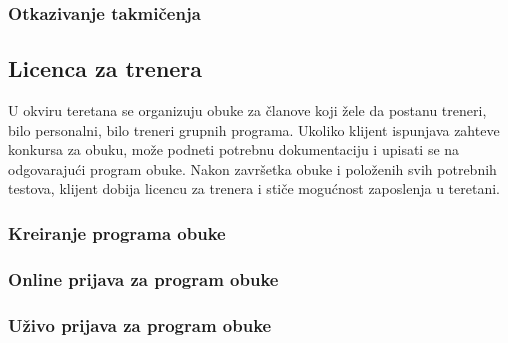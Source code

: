\documentclass[a4paper]{article}
\begin{document}
\subsubsection{Otkazivanje takmičenja}



\subsection{Licenca za trenera}

U okviru teretana se organizuju obuke za članove koji žele da postanu treneri, bilo personalni, bilo treneri grupnih programa. Ukoliko klijent ispunjava zahteve konkursa za obuku, može podneti potrebnu dokumentaciju i upisati se na odgovarajući program obuke. Nakon završetka obuke i položenih svih potrebnih testova, klijent dobija licencu za trenera i stiče mogućnost zaposlenja u teretani.

\subsubsection{Kreiranje programa obuke}


\subsubsection{Online prijava za program obuke}


\subsubsection{Uživo prijava za program obuke}

\end{document}
